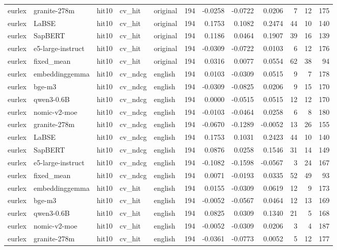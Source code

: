\begin{tabular}{lllllrrrrrrr}
eurlex & granite-278m & hit10 & cv\_hit & original & 194 & -0.0258 & -0.0722 & 0.0206 & 7 & 12 & 175 \\
eurlex & LaBSE & hit10 & cv\_hit & original & 194 & 0.1753 & 0.1082 & 0.2474 & 44 & 10 & 140 \\
eurlex & SapBERT & hit10 & cv\_hit & original & 194 & 0.1186 & 0.0464 & 0.1907 & 39 & 16 & 139 \\
eurlex & e5-large-instruct & hit10 & cv\_hit & original & 194 & -0.0309 & -0.0722 & 0.0103 & 6 & 12 & 176 \\
eurlex & fixed\_mean & hit10 & cv\_hit & original & 194 & 0.0316 & 0.0077 & 0.0554 & 62 & 38 & 94 \\
eurlex & embeddinggemma & hit10 & cv\_ndcg & english & 194 & 0.0103 & -0.0309 & 0.0515 & 9 & 7 & 178 \\
eurlex & bge-m3 & hit10 & cv\_ndcg & english & 194 & -0.0309 & -0.0825 & 0.0206 & 9 & 15 & 170 \\
eurlex & qwen3-0.6B & hit10 & cv\_ndcg & english & 194 & 0.0000 & -0.0515 & 0.0515 & 12 & 12 & 170 \\
eurlex & nomic-v2-moe & hit10 & cv\_ndcg & english & 194 & -0.0103 & -0.0464 & 0.0258 & 6 & 8 & 180 \\
eurlex & granite-278m & hit10 & cv\_ndcg & english & 194 & -0.0670 & -0.1289 & -0.0052 & 13 & 26 & 155 \\
eurlex & LaBSE & hit10 & cv\_ndcg & english & 194 & 0.1753 & 0.1031 & 0.2423 & 44 & 10 & 140 \\
eurlex & SapBERT & hit10 & cv\_ndcg & english & 194 & 0.0876 & 0.0258 & 0.1546 & 31 & 14 & 149 \\
eurlex & e5-large-instruct & hit10 & cv\_ndcg & english & 194 & -0.1082 & -0.1598 & -0.0567 & 3 & 24 & 167 \\
eurlex & fixed\_mean & hit10 & cv\_ndcg & english & 194 & 0.0071 & -0.0193 & 0.0335 & 52 & 49 & 93 \\
eurlex & embeddinggemma & hit10 & cv\_hit & english & 194 & 0.0155 & -0.0309 & 0.0619 & 12 & 9 & 173 \\
eurlex & bge-m3 & hit10 & cv\_hit & english & 194 & -0.0052 & -0.0567 & 0.0464 & 12 & 13 & 169 \\
eurlex & qwen3-0.6B & hit10 & cv\_hit & english & 194 & 0.0825 & 0.0309 & 0.1340 & 21 & 5 & 168 \\
eurlex & nomic-v2-moe & hit10 & cv\_hit & english & 194 & -0.0052 & -0.0309 & 0.0206 & 3 & 4 & 187 \\
eurlex & granite-278m & hit10 & cv\_hit & english & 194 & -0.0361 & -0.0773 & 0.0052 & 5 & 12 & 177 \\

\end{tabular}
